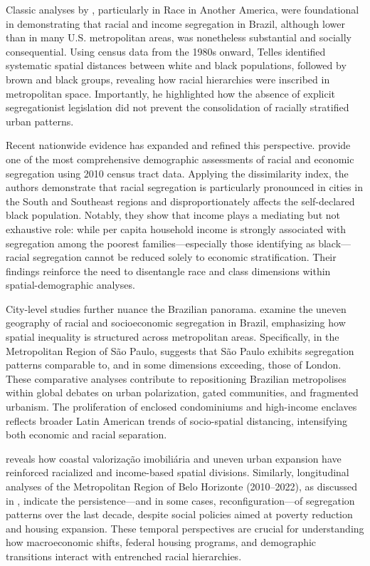 \documentclass[12pt,a4paper]{article}
\begin{document}
Classic analyses by \cite{telles2004race}, particularly in Race in Another America, were foundational in demonstrating that racial and income segregation in Brazil, although lower than in many U.S. metropolitan areas, was nonetheless substantial and socially consequential. Using census data from the 1980s onward, Telles identified systematic spatial distances between white and black populations, followed by brown and black groups, revealing how racial hierarchies were inscribed in metropolitan space. Importantly, he highlighted how the absence of explicit segregationist legislation did not prevent the consolidation of racially stratified urban patterns.

Recent nationwide evidence has expanded and refined this perspective. \cite{deSouza2023nationwide_english} provide one of the most comprehensive demographic assessments of racial and economic segregation using 2010 census tract data. Applying the dissimilarity index, the authors demonstrate that racial segregation is particularly pronounced in cities in the South and Southeast regions and disproportionately affects the self-declared black population. Notably, they show that income plays a mediating but not exhaustive role: while per capita household income is strongly associated with segregation among the poorest families—especially those identifying as black—racial segregation cannot be reduced solely to economic stratification. Their findings reinforce the need to disentangle race and class dimensions within spatial-demographic analyses.

City-level studies further nuance the Brazilian panorama. \cite{barros2018unevengeographies} examine the uneven geography of racial and socioeconomic segregation in Brazil, emphasizing how spatial inequality is structured across metropolitan areas. Specifically, in the Metropolitan Region of São Paulo, \cite{barros2024saopaulolondres} suggests that São Paulo exhibits segregation patterns comparable to, and in some dimensions exceeding, those of London. These comparative analyses contribute to repositioning Brazilian metropolises within global debates on urban polarization, gated communities, and fragmented urbanism. The proliferation of enclosed condominiums and high-income enclaves reflects broader Latin American trends of socio-spatial distancing, intensifying both economic and racial separation.

\cite{danilofranca2022fortaleza} reveals how coastal valorização imobiliária and uneven urban expansion have reinforced racialized and income-based spatial divisions. Similarly, longitudinal analyses of the Metropolitan Region of Belo Horizonte (2010–2022), as discussed in \cite{strauch2026bh20102022}, indicate the persistence—and in some cases, reconfiguration—of segregation patterns over the last decade, despite social policies aimed at poverty reduction and housing expansion. These temporal perspectives are crucial for understanding how macroeconomic shifts, federal housing programs, and demographic transitions interact with entrenched racial hierarchies.
\end{document}
